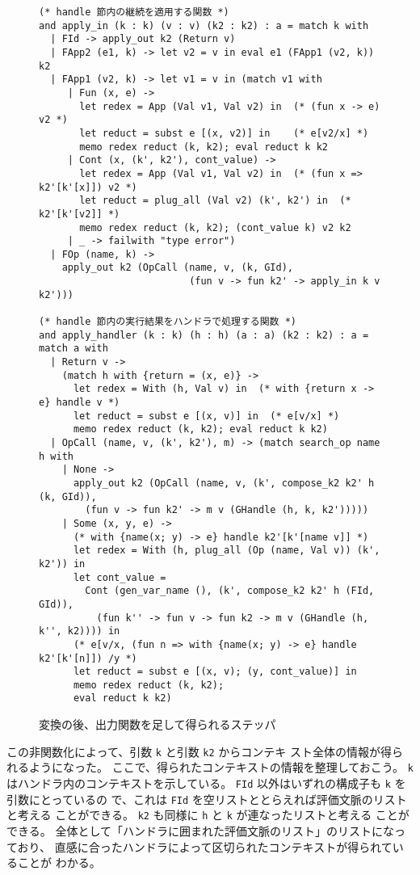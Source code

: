 \begin{figure}
\begin{verbatim}
(* handle 節内の継続を適用する関数 *)
and apply_in (k : k) (v : v) (k2 : k2) : a = match k with
  | FId -> apply_out k2 (Return v)
  | FApp2 (e1, k) -> let v2 = v in eval e1 (FApp1 (v2, k)) k2
  | FApp1 (v2, k) -> let v1 = v in (match v1 with
     | Fun (x, e) ->
       let redex = App (Val v1, Val v2) in  (* (fun x -> e) v2 *)
       let reduct = subst e [(x, v2)] in    (* e[v2/x] *)
       memo redex reduct (k, k2); eval reduct k k2
     | Cont (x, (k', k2'), cont_value) ->
       let redex = App (Val v1, Val v2) in  (* (fun x => k2'[k'[x]]) v2 *)
       let reduct = plug_all (Val v2) (k', k2') in  (* k2'[k'[v2]] *)
       memo redex reduct (k, k2); (cont_value k) v2 k2
     | _ -> failwith "type error")
  | FOp (name, k) ->
    apply_out k2 (OpCall (name, v, (k, GId),
                          (fun v -> fun k2' -> apply_in k v k2')))

(* handle 節内の実行結果をハンドラで処理する関数 *)
and apply_handler (k : k) (h : h) (a : a) (k2 : k2) : a = match a with
  | Return v ->
    (match h with {return = (x, e)} ->
      let redex = With (h, Val v) in  (* with {return x -> e} handle v *)
      let reduct = subst e [(x, v)] in  (* e[v/x] *)
      memo redex reduct (k, k2); eval reduct k k2)
  | OpCall (name, v, (k', k2'), m) -> (match search_op name h with
    | None ->
      apply_out k2 (OpCall (name, v, (k', compose_k2 k2' h (k, GId)),
        (fun v -> fun k2' -> m v (GHandle (h, k, k2')))))
    | Some (x, y, e) ->
      (* with {name(x; y) -> e} handle k2'[k'[name v]] *)
      let redex = With (h, plug_all (Op (name, Val v)) (k', k2')) in
      let cont_value =
        Cont (gen_var_name (), (k', compose_k2 k2' h (FId, GId)),
          (fun k'' -> fun v -> fun k2 -> m v (GHandle (h, k'', k2)))) in
      (* e[v/x, (fun n => with {name(x; y) -> e} handle k2'[k'[n]]) /y *)
      let reduct = subst e [(x, v); (y, cont_value)] in
      memo redex reduct (k, k2);
      eval reduct k k2)
\end{verbatim}
\caption{変換の後、出力関数を足して得られるステッパ}
\label{figure:5memo}
\end{figure}

この非関数化によって、引数 \texttt{k} と引数 \texttt{k2} からコンテキ
スト全体の情報が得られるようになった。
ここで、得られたコンテキストの情報を整理しておこう。
\texttt{k} はハンドラ内のコンテキストを示している。
\texttt{FId} 以外はいずれの構成子も \texttt{k} を引数にとっているの
で、これは \texttt{FId} を空リストととらえれば評価文脈のリストと考える
ことができる。
\texttt{k2} も同様に \texttt{h} と \texttt{k} が連なったリストと考える
ことができる。
全体として「ハンドラに囲まれた評価文脈のリスト」のリストになっており、
直感に合ったハンドラによって区切られたコンテキストが得られていることが
わかる。

